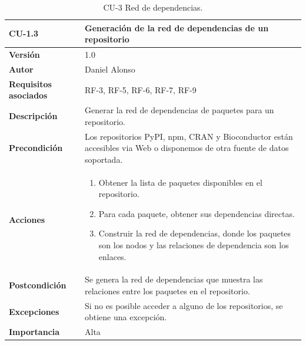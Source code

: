 \begin{table}[p]
	\centering
	\begin{tabularx}{\linewidth}{ p{} p{} }
		\toprule
		\textbf{CU-1.3}               & \textbf{Generación de la red de dependencias de un repositorio}                                                          \\
		\toprule
		\textbf{Versión}              & 1.0                                                                                                                      \\
		\textbf{Autor}                & Daniel Alonso                                                                                                            \\
		\textbf{Requisitos asociados} & RF-3, RF-5, RF-6, RF-7, RF-9                                                                                             \\
		\textbf{Descripción}          & Generar la red de dependencias de paquetes para un repositorio.                                                           \\
		\textbf{Precondición}         & Los repositorios PyPI, npm, CRAN y Bioconductor están accesibles via Web o disponemos de otra fuente de datos soportada. \\
		\textbf{Acciones}             &
		\begin{enumerate}
			\def\labelenumi{\arabic{enumi}.}
			\tightlist
			\item Obtener la lista de paquetes disponibles en el repositorio.
			\item Para cada paquete, obtener sus dependencias directas.
			\item Construir la red de dependencias, donde los paquetes son los nodos y las relaciones de dependencia son los enlaces.
		\end{enumerate}                                 \\
		\textbf{Postcondición}        & Se genera la red de dependencias que muestra las relaciones entre los paquetes en el repositorio.                        \\
		\textbf{Excepciones}          & Si no es posible acceder a alguno de los repositorios, se obtiene una excepción.                                         \\
		\textbf{Importancia}          & Alta                                                                                                                     \\
		\bottomrule
	\end{tabularx}
	\caption{CU-3 Red de dependencias.}
	\label{tab:cu3}
\end{table}

